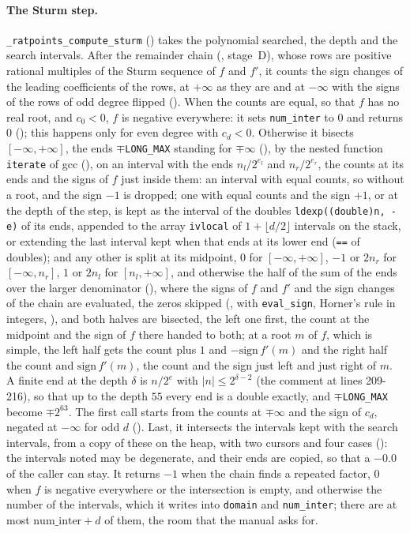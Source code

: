 \paragraph{The Sturm step.} \verb|_ratpoints_compute_sturm| () takes the
polynomial searched, the depth and the search intervals. After the remainder chain
(, stage~D), whose rows are positive rational multiples of the Sturm
sequence of $f$ and $f'$, it counts the sign changes of the leading coefficients of the rows, at
$+\infty$ as they are and at $-\infty$ with the signs of the rows of odd degree flipped
(). When the counts are equal, so that $f$ has no real root, and $c_0 <
0$, $f$ is negative everywhere: it sets \verb|num_inter| to $0$ and returns $0$
(); this happens only for even degree with $c_d < 0$. Otherwise it
bisects $[-\infty, +\infty]$, the ends $\mp$\verb|LONG_MAX| standing for $\mp\infty$
(), by the nested function \verb|iterate| of gcc
(), on an interval with the ends $n_l/2^{e_l}$ and $n_r/2^{e_r}$, the
counts at its ends and the signs of $f$ just inside them: an interval with equal counts, so without
a root, and the sign $-1$ is dropped; one with equal counts and the sign $+1$, or at the depth of
the step, is kept as the interval of the doubles \verb|ldexp((double)n, -e)| of its ends, appended
to the array \verb|ivlocal| of $1 + \lfloor d/2 \rfloor$ intervals on the stack, or extending the
last interval kept when that ends at its lower end (\verb|==| of doubles); and any other is split at
its midpoint, $0$ for $[-\infty, +\infty]$, $-1$ or $2 n_r$ for $[-\infty, n_r]$, $1$ or $2 n_l$ for
$[n_l, +\infty]$, and otherwise the half of the sum of the ends over the larger denominator
(), where the signs of $f$ and $f'$ and the sign changes of the chain are
evaluated, the zeros skipped (, with \verb|eval_sign|, Horner's rule in
integers, ), and both halves are bisected, the left one first, the count at
the midpoint and the sign of $f$ there handed to both; at a root $m$ of $f$, which is simple, the
left half gets the count plus $1$ and $-\mathrm{sign}\, f'(m)$ and the right half the count and
$\mathrm{sign}\, f'(m)$, the count and the sign just left and just right of $m$. A finite end at the
depth $\delta$ is $n/2^e$ with $|n| \le 2^{\delta - 2}$ (the comment at lines 209-216), so that up
to the depth $55$ every end is a double exactly, and $\mp$\verb|LONG_MAX| become $\mp 2^{63}$. The
first call starts from the counts at $\mp\infty$ and the sign of $c_d$, negated at $-\infty$ for odd
$d$ (). Last, it intersects the intervals kept with the search intervals,
from a copy of these on the heap, with two cursors and four cases (): the
intervals noted may be degenerate, and their ends are copied, so that a $-0.0$ of the caller can
stay. It returns $-1$ when the chain finds a repeated factor, $0$ when $f$ is negative everywhere or
the intersection is empty, and otherwise the number of the intervals, which it writes into
\verb|domain| and \verb|num_inter|; there are at most $\mathrm{num\_inter} + d$ of them, the room
that the manual asks for.

